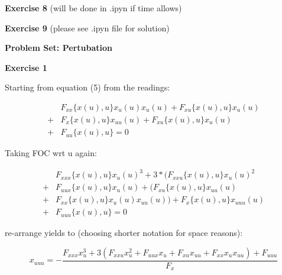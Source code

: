 \documentclass[letterpaper,12pt]{article}
\theoremstyle{definition}
\begin{document}
\noindent\textbf{Exercise 8}
(will be done in .ipyn if time allows)

\noindent\textbf{Exercise 9}
(please see .ipyn file for solution)

\begin{flushleft}
  \textbf{\large{Problem Set: Pertubation}} \\
\end{flushleft}

\vspace{5mm}

\noindent\textbf{Exercise 1}

Starting from equation (5) from the readings:

\begin{equation}
  \begin{aligned} & F_{x x}\{x(u), u\} x_{u}(u) x_{u}(u)+F_{x u}\{x(u), u\} x_{u}(u) \\+& F_{x}\{x(u), u\} x_{u u}(u)+F_{x u}\{x(u), u\} x_{u}(u) \\+& F_{u u}\{x(u), u\}=0 \end{aligned}
\end{equation}

Taking FOC wrt u again:

\begin{equation}
  \begin{aligned} & F_{x x x}\{x(u), u\} x_{u}(u)^3+3*
    (F_{x x u}\{x(u), u\}x_{u}(u)^2
    \\+& F_{u u x}\{x(u), u\}x_{u}(u) + (F_{x u}\{x(u), u\}x_{u u}(u)
    \\+& F_{x x}\{x(u), u\}x_{u}(u)x_{u u}(u)) + F_{x}\{x(u), u\}x_{u u u}(u)
    \\+& F_{u u u}\{x(u), u\}= 0\end{aligned}
  \end{equation}

re-arrange yields to (choosing shorter notation for space reasons):

\begin{equation}
  x_{u u u}=-\frac{F_{x x x} x_{u}^{3}+3\left(F_{x x u} x_{u}^{2}+F_{u u x} x_{u}+F_{x u} x_{u u}+F_{x x} x_{u} x_{u u}\right)+F_{u u u}}{F_{x}}
\end{equation}
\end{document}
